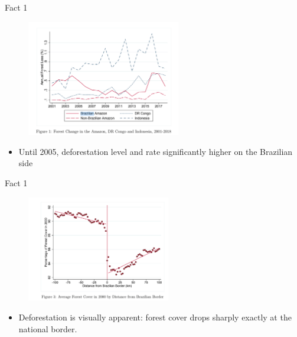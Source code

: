 \documentclass[11pt,notes=hide,aspectratio=169,mathserif]{beamer}
\begin{document}
\begin{frame}{Fact 1}
\begin{figure}
\centering
\includegraphics[width=0.6\textwidth]{inputs/fig2.1.png}
\end{figure}
\begin{itemize}
\item Until 2005, deforestation level and rate significantly higher on the Brazilian side 
\end{itemize}
\end{frame}

\begin{frame}{Fact 1}
\begin{figure}
\centering
\includegraphics[width=0.56\textwidth]{inputs/fig2.3.png}
\end{figure}
\begin{itemize}
\item Deforestation is visually apparent: forest cover drops sharply exactly at the national border.
\end{itemize}
\end{frame}
\end{document}
